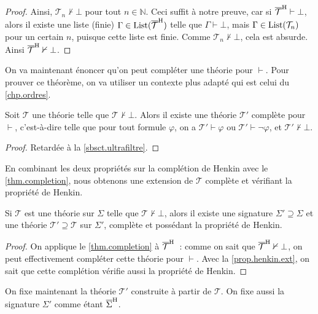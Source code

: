 \begin{proof}
  Ainsi, $\mathcal T_n\nvdash\bot$ pour tout $n\in \mathbb N$. Ceci suffit à
  notre preuve, car si $\overline{\mathcal T}^{\mathrm H}\vdash \bot$, alors il existe une
  liste (finie) $\Gamma\in\operatorname{List}(\overline{\mathcal T}^{\mathrm H})$ telle que
  $\Gamma\vdash\bot$, mais $\Gamma\in\operatorname{List}(\mathcal T_n)$ pour un certain $n$,
  puisque cette liste est finie. Comme $\mathcal T_n\nvdash\bot$, cela est
  absurde. Ainsi $\overline{\mathcal T}^{\mathrm H}\nvdash\bot$.
\end{proof}

On va maintenant énoncer qu'on peut compléter une théorie pour $\vdash$. Pour
prouver ce théorème, on va utiliser un contexte plus adapté qui est celui du
\cref{chp.ordres}.

\begin{theorem}\label{thm.completion}
  Soit $\mathcal T$ une théorie telle que $\mathcal T \nvdash \bot$. Alors il
  existe une théorie $\mathcal T'$ complète pour $\vdash$, c'est-à-dire telle
  que pour tout formule $\varphi$, on a $\mathcal T'\vdash \varphi$ ou
  $\mathcal T'\vdash \lnot \varphi$, et $\mathcal T'\nvdash\bot$.
\end{theorem}

\begin{proof}
  Retardée à la \cref{sbsct.ultrafiltre}.
\end{proof}

En combinant les deux propriétés sur la complétion de Henkin avec le
\cref{thm.completion}, nous obtenons une extension de $\mathcal T$ complète et
vérifiant la propriété de Henkin.

\begin{lemma}
  Si $\mathcal T$ est une théorie sur $\Sigma$ telle que
  $\mathcal T\nvdash\bot$, alors il existe une signature
  $\Sigma'\supseteq\Sigma$ et une théorie
  $\mathcal T'\supseteq\mathcal T$ sur $\Sigma'$, complète et possédant la
  propriété de Henkin.
\end{lemma}

\begin{proof}
  On applique le \cref{thm.completion} à $\overline{\mathcal T}^{\mathrm H}$~: comme on sait
  que $\overline{\mathcal T}^{\mathrm H}\nvdash\bot$, on peut effectivement compléter cette
  théorie pour $\vdash$. Avec la \cref{prop.henkin.ext}, on sait que cette
  complétion vérifie aussi la propriété de Henkin.
\end{proof}

On fixe maintenant la théorie $\mathcal T'$ construite à partir de $\mathcal T$.
On fixe aussi la signature $\Sigma'$ comme étant $\overline{\Sigma}^{\mathrm H}$.

